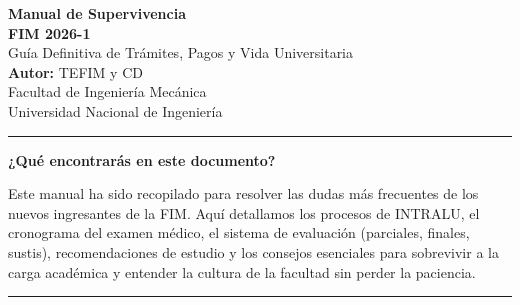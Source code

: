 \documentclass[12pt,a4paper]{article}
\begin{document}
\begin{titlepage}
    \centering
    \vspace*{2cm}
    
    {\Huge \textbf{Manual de Supervivencia}}\\[0.5cm]
    {\Huge \textbf{FIM 2026-1}}\\[1.5cm]
    
    {\Large Guía Definitiva de Trámites, Pagos y Vida Universitaria}\\[2cm]
    
    {\Large \textbf{Autor:} TEFIM y CD}\\[1cm] 
    
    {\large Facultad de Ingeniería Mecánica}\\[0.5cm]
    {\large Universidad Nacional de Ingeniería}\\[3cm]
    
    \vfill
    
    \hrule
    \vspace{0.5cm}
    \textbf{¿Qué encontrarás en este documento?}\\[0.5cm]
    \begin{flushleft}
    Este manual ha sido recopilado para resolver las dudas más frecuentes de los nuevos ingresantes de la FIM. Aquí detallamos los procesos de INTRALU, el cronograma del examen médico, el sistema de evaluación (parciales, finales, sustis), recomendaciones de estudio y los consejos esenciales para sobrevivir a la carga académica y entender la cultura de la facultad sin perder la paciencia.
    \end{flushleft}
    \vspace{0.5cm}
    \hrule
\end{titlepage}

\tableofcontents
\newpage


\newpage

\newpage

\newpage

\newpage

\newpage

\end{document}
